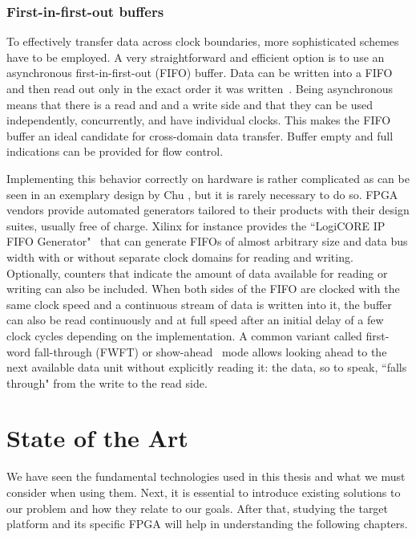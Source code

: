 \documentclass[a4paper, 11pt, oneside]{Thesis}  %
\begin{document}
\subsection{First-in-first-out buffers}\label{ch:fifo}

To effectively transfer data across clock boundaries, more sophisticated schemes have to be employed. A very straightforward and efficient option is to use an asynchronous first-in-first-out (FIFO) buffer. Data can be written into a FIFO and then read out only in the exact order it was written~\cite{RTLHardwareDesign}. Being asynchronous means that there is a read and and a write side and that they can be used independently, concurrently, and have individual clocks. This makes the FIFO buffer an ideal candidate for cross-domain data transfer. Buffer empty and full indications can be provided for flow control.

Implementing this behavior correctly on hardware is rather complicated as can be seen in an exemplary design by Chu \cite[652-660]{RTLHardwareDesign}, but it is rarely necessary to do so. FPGA vendors provide automated generators tailored to their products with their design suites, usually free of charge. Xilinx for instance provides the ``LogiCORE IP FIFO Generator"~\cite{XilinxFIFO} that can generate FIFOs of almost arbitrary size and data bus width with or without separate clock domains for reading and writing. Optionally, counters that indicate the amount of data available for reading or writing can also be included. When both sides of the FIFO are clocked with the same clock speed and a continuous stream of data is written into it, the buffer can also be read continuously and at full speed after an initial delay of a few clock cycles depending on the implementation. A common variant called first-word fall-through (FWFT) or show-ahead~\cite{AlteraFIFO} mode allows looking ahead to the next available data unit without explicitly reading it: the data, so to speak, ``falls through" from the write to the read side.

\chapter{State of the Art}\label{ch:state_of_the_art}

We have seen the fundamental technologies used in this thesis and what we must consider when using them. Next, it is essential to introduce existing solutions to our problem and how they relate to our goals. After that, studying the target platform and its specific FPGA will help in understanding the following chapters.
\end{document}
